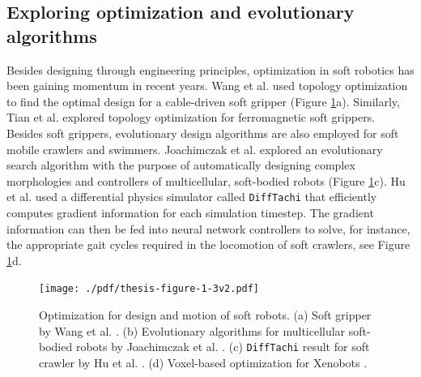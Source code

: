 \subsection{Exploring optimization and evolutionary algorithms}
Besides designing through engineering principles, optimization in soft robotics has been gaining momentum in recent years. Wang et al. \cite{Wang2020Nov} used topology optimization to find the optimal design for a cable-driven soft gripper (Figure \ref{fig:C0:optztypes}a). Similarly, Tian et al. \cite{Tian2020May} explored topology optimization for ferromagnetic soft grippers. Besides soft grippers, evolutionary design algorithms are also employed for soft mobile crawlers and swimmers. Joachimczak et al. \cite{Joachimczak2014Jul,Joachimczak2015} explored an evolutionary search algorithm with the purpose of automatically designing complex morphologies and controllers of multicellular, soft-bodied robots (Figure \ref{fig:C0:optztypes}c). Hu et al. \cite{Hu2019taichi} used a differential physics simulator called \texttt{DiffTachi} that efficiently computes gradient information for each simulation timestep. The gradient information can then be fed into neural network controllers to solve, for instance, the appropriate gait cycles required in the locomotion of soft crawlers, see Figure \ref{fig:C0:optztypes}d.

\begin{figure}[!t]
  \vspace{-2mm}
  \texttt{[image: ./pdf/thesis-figure-1-3v2.pdf]}
  \vspace{-6mm}
  \caption{Optimization for design and motion of soft robots. (a) Soft gripper by Wang et al. \cite{Wang2020Nov}. (b) Evolutionary algorithms for multicellular soft-bodied robots by Joachimczak et al. \cite{Joachimczak2014Jul,Joachimczak2015}. (c) \texttt{DiffTachi} result for soft crawler by Hu et al. \cite{Hu2019taichi}. (d) Voxel-based optimization for Xenobots \cite{Kriegman2019}.}
  \label{fig:C0:optztypes}
  \vspace{-4mm}
\end{figure}

\vspace{-2mm}
